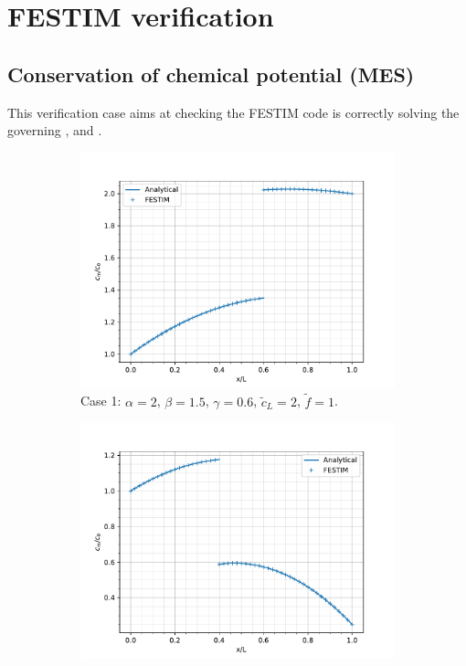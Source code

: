 \chapter{FESTIM verification}\label{appendix verification}

\section{Conservation of chemical potential (MES)}
This verification case aims at checking the FESTIM code is correctly solving the governing ,  and .

\begin{figure} [h]
    \centering
    \begin{subfigure}{0.5\linewidth}
        \centering
        \includegraphics[width=\linewidth]{Figures/Chapter3/monoblocks/interface_condition/out_MES_case1.pdf}
        \caption{Case 1: $\alpha = 2$, $\beta = 1.5$, $\gamma=0.6$, $\tilde{c}_L = 2$, $\tilde{f}=1$.}
    \end{subfigure}%
    \begin{subfigure}{0.5\linewidth}
        \centering
        \includegraphics[width=\linewidth]{Figures/Chapter3/monoblocks/interface_condition/out_MES_case2.pdf}

\end{subfigure}
\end{figure}
